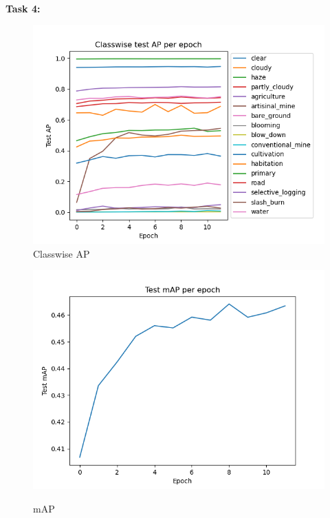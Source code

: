 \documentclass[12pt, letterpaper, twoside]{article}
\begin{document}
\newpage
\ \\
\textbf{Task 4:}\\
\begin{figure}[ht] 
  \begin{minipage}[b]{0.5\linewidth}
    \centering
    \includegraphics[scale=0.5]{"Task4_AP.png"}\\ 
    \caption{Classwise AP} 
    \vspace{4ex}
  \end{minipage}%
  \begin{minipage}[b]{0.5\linewidth}
    \centering
    \includegraphics[scale=0.5]{"Task4_mAP.png"}\\ 
    \caption{mAP} 
    \vspace{4ex}

\end{minipage}
\end{figure}
\end{document}
